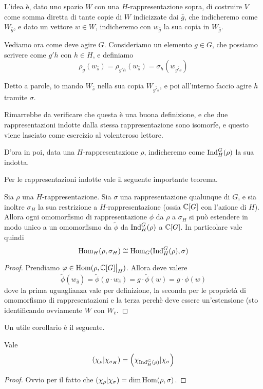 		L'idea è, dato uno spazio $W$ con una $H$-rappresentazione sopra, di costruire $V$ come somma diretta di tante copie di $W$ indicizzate dai $\bar g$, che indicheremo come $W_{\bar g}$, e dato un vettore $w\in W$, indicheremo con $w_{\bar g}$ la sua copia in $W_{\bar g}$. 
		
		Vediamo ora come deve agire $G$. Consideriamo un elemento $g\in G$, che possiamo scrivere come $g'h$ con $h\in H$, e definiamo
		\[
			\rho_g(w_{\bar s}) = \rho_{g'h}(w_{\bar s})= \sigma_h(w_{\bar{g's}})
		\]
		
		Detto a parole, io mando $W_{\bar s}$ nella sua copia $W_{\bar {g's}}$, e poi all'interno faccio agire $h$ tramite $\sigma$. 
		
		Rimarrebbe da verificare che questa è una buona definizione, e che due rappresentazioni indotte dalla stessa rappresentazione sono isomorfe, e questo viene lasciato come esercizio al volenteroso lettore.
		
		D'ora in poi, data una $H$-rappresentazione $\rho$, indicheremo come $\operatorname{Ind}_H^G(\rho)$ la sua indotta.
		
		Per le rappresentazioni indotte vale il seguente importante teorema.
		\begin{mytheorem}[di Frobenius]
			Sia $\rho$ una $H$-rappresentazione. Sia $\sigma$ una rappresentazione qualunque di $G$, e sia inoltre $\sigma_H$ la sua restrizione a $H$-rappresentazione (ossia $\mathbb C[G]$ con l'azione di $H$). Allora ogni omomorfismo di rappresentazione $\phi$ da $\rho$ a $\sigma_H$ si può estendere in modo unico a un omomorfismo da $\tilde\phi$ da $\operatorname{Ind}_H^G(\rho)$ a $\mathbb C[G]$. In particolare vale quindi
			\[
				\operatorname{Hom}_H(\rho, \sigma_H) \cong \operatorname{Hom}_G(\operatorname{Ind}_H^G(\rho), \sigma)
			\]
		\end{mytheorem}
		\begin{proof}
			Prendiamo $\phi \in \Hom(\rho, \restr{\bC[G]}{H})$. Allora deve valere 
			 \[
				\tilde\phi (w_{\bar g}) = \tilde\phi(g \cdot w_{\bar e}) = g \cdot \tilde\phi(w) = g\cdot \phi (w)			  
			 \]
			dove la prima uguaglianza vale per definizione, la seconda per le proprietà di omomorfismo di rappresentazioni e la terza perchè deve essere un'estensione (sto identificando ovviamente $W$ con $W_{\bar e}$. 
		\end{proof}
		
		Un utile corollario è il seguente.
		\begin{mycor}
		 Vale 
		 \[
		  \left(\chi_\rho | \chi_{\sigma_H}\right) = \left(\chi_{\operatorname{Ind}_H^G(\rho)} | \chi_\sigma\right)
		 \]

		\end{mycor}
		\begin{proof}
			Ovvio per il fatto che $\left(\chi_\rho | \chi_\sigma\right)=\dim \operatorname{Hom} (\rho,\sigma)$.
		\end{proof}
		
